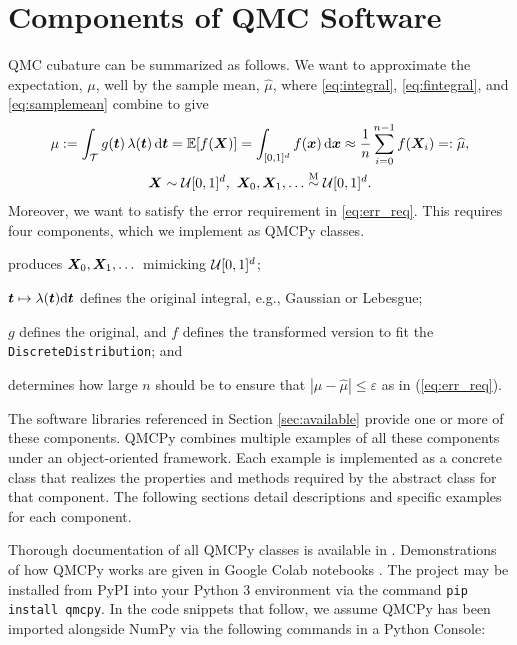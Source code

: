 \documentclass[graybox,footinfo]{svmult}
\newcommand{\QMCPYabs}[1]{\ensuremath{{\left \lvert #1 \right \rvert}}}
\newcommand{\hmu}{\widehat{\mu}}
\newcommand{\Msim}{\overset{\textup{M}}{\sim}}
\newcommand{\cube}{[0,1]^d}
\begin{document}
\section{Components of QMC Software}
QMC cubature can be summarized as follows.  We want to approximate the expectation, $\mu$, well by the sample mean, $\hmu$, where \eqref{eq:integral}, \eqref{eq:fintegral}, and \eqref{eq:samplemean} combine to give
\begin{multline} \label{eq:cubSummary}
	\mu : = \int_\calT g(\bst) \, \lambda(\bst) \, \D \bst  = \bbE[f(\bsX)] = \int_{\cube} f(\bsx) \, \D \bsx \approx \frac 1n \sum_{i=0}^{n-1} f(\bsX_i) =: \hmu, \\
	 \bsX \sim \calU\cube, \ \bsX_0, \bsX_1, \ldots \Msim \calU\cube.
\end{multline}
Moreover, we want to satisfy the error requirement in \eqref{eq:err_req}.
This requires four components, which we implement as QMCPy classes.

\begin{description}[format=\textup,format=\textbf]
	
	\item[Discrete Distribution]  produces ${\boldsymbol{X}}_0, {\boldsymbol{X}}_1, \dots$ mimicking ${\mathcal{U}}[0,1]^d$;
	
	\item[True Measure] ${\boldsymbol{t}} \mapsto \lambda ({\boldsymbol{t}}) \mathrm{d} {\boldsymbol{t}}$  defines the original integral, e.g., Gaussian or Lebesgue;
	
	\item[Integrand] $g$  defines the original, and $f$ defines the transformed version to fit the \texttt{DiscreteDistribution}; and
	
	\item[Stopping Criterion] determines how large $n$ should be to ensure that $\QMCPYabs{\mu - \hmu} \le \varepsilon$ as in (\ref{eq:err_req}).
\end{description}

The software libraries referenced in Section \ref{sec:available} provide one or more of these components. QMCPy combines multiple examples of all these components under an object-oriented framework. Each example is implemented as a concrete class that realizes the properties and methods required by the abstract class for that component. The following sections detail descriptions and specific examples for each component. 

Thorough documentation of all QMCPy classes is available in \cite{QMCPyDocs}. Demonstrations of how QMCPy works are given in Google Colab notebooks \cite{QMCPyTutColab2020,QMCPyTutColab2020_paper}. The project may be installed from PyPI into your Python 3 environment via the command \texttt{pip install qmcpy}. In the code snippets that follow, we assume QMCPy has been imported alongside NumPy \cite{numpy} via the following commands in a Python Console:

\end{document}
